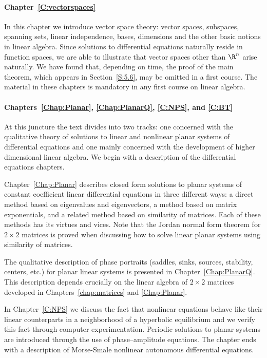 \paragraph{Chapter~\ref{C:vectorspaces}} In this chapter we introduce vector 
space theory: vector spaces, subspaces, spanning sets, linear independence, 
bases, dimensions and the other basic notions in linear algebra.  Since 
solutions to differential equations naturally reside in function spaces, we 
are able to illustrate that vector spaces other than $\R^n$ arise naturally.  
We have found that, depending on time, the proof of the main theorem, which 
appears in Section~\ref{S:5.6}, may be omitted in a first course.  The 
material in these chapters is mandatory in any first course on linear algebra.

\paragraph{Chapters~\ref{Chap:Planar}, \ref{Chap:PlanarQ}, \ref{C:NPS}, and 
\ref{C:BT}}  At this juncture the text divides into two tracks: one concerned 
with the qualitative theory of solutions to linear and nonlinear planar 
systems of differential equations and one mainly concerned with the 
development of higher dimensional linear algebra.  We begin with a 
description of the differential equations chapters.

Chapter~\ref{Chap:Planar} describes closed form solutions to planar systems 
of constant coefficient linear differential equations in three different
ways: a direct method based on eigenvalues and eigenvectors, a method based
on matrix exponentials, and a related method based on similarity of matrices.
Each of these methods has its virtues and vices.  Note that the Jordan normal 
form theorem for $2\times 2$ matrices is proved when discussing how to solve 
linear planar systems using similarity of matrices.

The qualitative description of phase portraits (saddles, sinks, sources,
stability, centers, etc.) for planar linear systems is presented in 
Chapter~\ref{Chap:PlanarQ}.  This description depends crucially on the linear 
algebra of $2\times 2$ matrices developed in Chapters~\ref{chap:matrices} 
and \ref{Chap:Planar}.

In Chapter~\ref{C:NPS} we discuss the fact that nonlinear equations behave 
like their linear counterparts in a neighborhood of a hyperbolic equilibrium 
and we verify this fact through computer experimentation.  Periodic solutions 
to planar systems are introduced through the use of phase--amplitude 
equations.  The chapter ends with a description of Morse-Smale nonlinear 
autonomous differential equations.  

